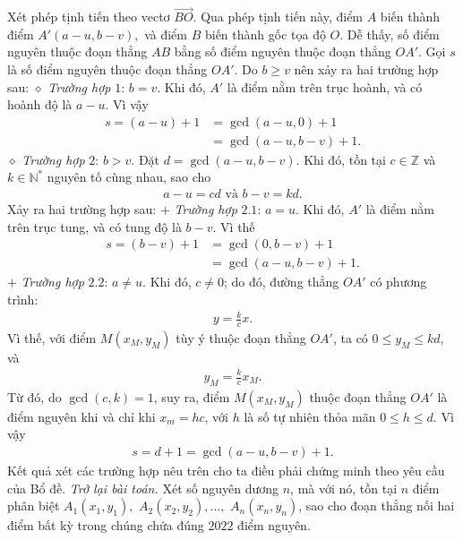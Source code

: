 \begin{multicols}{2}
	Xét phép tịnh tiến theo vectơ $\overrightarrow{BO}$. Qua phép tịnh tiến này, điểm $A$ biến thành điểm $A'\left( {a - u,b - v} \right),$  và điểm $B$ biến thành gốc tọa độ $O$. Dễ thấy, số điểm nguyên thuộc đoạn thẳng $AB$ bằng số điểm nguyên thuộc đoạn thẳng $OA'$.
	\vskip 0.05cm 
	Gọi $s$ là số điểm nguyên thuộc đoạn thẳng $OA'$.
	\vskip 0.05cm
	Do $b \ge  v$ nên xảy ra hai trường hợp sau:
	\vskip 0.05cm
	$\diamond$ \textit{Trường hợp} $1$: $b = v$.
	\vskip 0.05cm
	Khi đó, $A'$  là điểm nằm trên trục hoành, và có hoành độ là $a - u$. Vì vậy
	\begin{align*}
		s = (a - u) + 1 &= \gcd(a - u, 0) + 1 \\
		&= \gcd(a - u, b - v) + 1.
	\end{align*}
	$\diamond$ \textit{Trường hợp} $2$: $b > v$.
	\vskip 0.05cm
	Đặt $d = \gcd(a - u, b - v)$.
	\vskip 0.05cm
	Khi đó, tồn tại $c\in \mathbb{Z}$  và $k \in \mathbb{N^*}$  nguyên tố cùng nhau, sao cho
	\begin{align*}
		a - u = cd \text{ và } b - v = kd.
	\end{align*}
	Xảy ra hai trường hợp sau:
	\vskip 0.05cm
	$+$ \textit{Trường hợp} $2.1$: $a = u$.
	\vskip 0.05cm
	Khi đó, $A'$  là điểm nằm trên trục tung, và có tung độ là $b - v$. Vì thế
	\begin{align*}
		s = (b - v) + 1 &= \gcd(0, b - v) + 1 \\
		&= \gcd(a - u, b - v) + 1.
	\end{align*}
	$+$ \textit{Trường hợp} $2.2$: $a \ne u$.
	\vskip 0.05cm
	Khi đó, $c \ne 0$; do đó, đường thẳng $OA'$  có phương trình:
	\begin{align*}
		y = \frac{k}{c}x.
	\end{align*}
	Vì thế, với điểm $M\left( {{x_M},{y_M}} \right)$  tùy ý thuộc đoạn thẳng $OA'$,  ta có $0 \le {y_M} \le kd,$  và
	\begin{align*}
		{y_M} = \frac{k}{c}{x_M}.
	\end{align*}
	Từ đó, do $\gcd(c, k) = 1$, suy ra, điểm  $M\left( {{x_M},{y_M}} \right)$ thuộc đoạn thẳng  $OA'$ là điểm nguyên khi và chỉ khi $x_m = hc$,  với $h$ là số tự nhiên thỏa mãn $0 \le h \le d$. Vì vậy
	\begin{align*}
		s = d + 1 = \gcd(a - u, b - v) + 1.
	\end{align*}
	Kết quả xét các trường hợp nêu trên cho ta điều phải chứng minh theo yêu cầu của Bổ đề.
	\vskip 0.05cm
	\textit{Trở lại bài toán.}
	\vskip 0.05cm
	Xét số nguyên dương $n$, mà với nó, tồn tại $n$ điểm phân biệt  ${A_1}\left( {{x_1},{y_1}} \right),$ ${A_2}\left( {{x_2},{y_2}} \right), \ldots ,$ ${A_n}\left( {{x_n},{y_n}} \right)$, sao cho đoạn thẳng nối hai điểm bất kỳ trong chúng chứa đúng $2022$ điểm nguyên.

\end{multicols}

